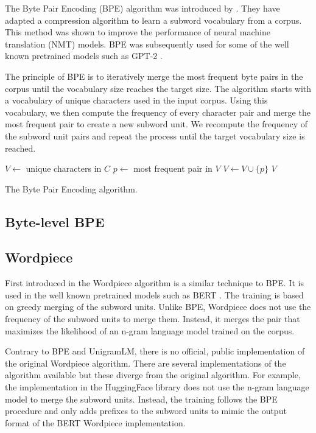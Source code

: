 The Byte Pair Encoding (BPE) algorithm was introduced by \citet{Sennrich2015}. They have adapted a compression algorithm  to learn a subword vocabulary from a corpus. This method was shown to improve the performance of neural machine translation (NMT) models. BPE was subsequently used for some of the well known pretrained models such as GPT-2 \citep{Radford2019}.

The principle of BPE is to iteratively merge the most frequent byte pairs in the corpus until the vocabulary size reaches the target size. The algorithm starts with a vocabulary of unique characters used in the input corpus. Using this vocabulary, we then compute the frequency of every character pair and merge the most frequent pair to create a new subword unit. We recompute the frequency of the subword unit pairs and repeat the process until the target vocabulary size is reached.

\begin{algorithm}
    \begin{algorithmic}
        \State $V \gets$ unique characters in $C$
        \State $p \gets$ most frequent pair in $V$
        \State $V \gets V \cup \{p\}$
        \EndWhile
        \State \Return $V$
        \EndFunction
    \end{algorithmic}
    \caption{The Byte Pair Encoding algorithm.}
    \label{alg:bpe}
\end{algorithm}

\subsection{Byte-level BPE}


\subsection{Wordpiece}

First introduced in \cite{SchusterandNakajima2012)} the Wordpiece algorithm is a similar technique to BPE. It is used in the well known pretrained models such as BERT \citep{devlin_bert_2019}. The training is based on greedy merging of the subword units. Unlike BPE, Wordpiece does not use the frequency of the subword units to merge them. Instead, it merges the pair that maximizes the likelihood of an n-gram language model trained on the corpus.

Contrary to BPE and UnigramLM, there is no official, public implementation of the original Wordpiece algorithm. There are several implementations of the algorithm available but these diverge from the original algorithm. For example, the implementation in the HuggingFace library \citep{Wolf2019} does not use the n-gram language model to merge the subword units. Instead, the training follows the BPE procedure and only adds prefixes to the subword units to mimic the output format of the BERT Wordpiece implementation.


